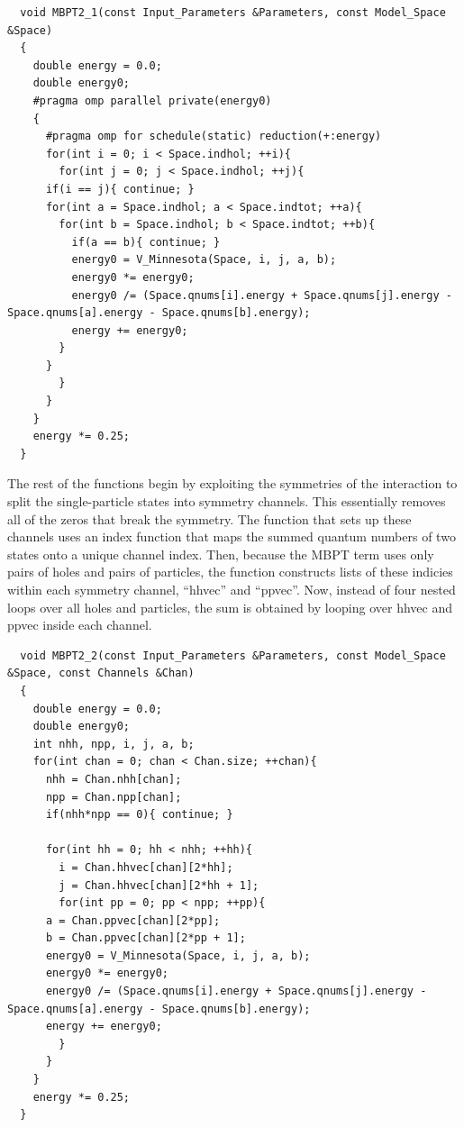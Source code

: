 \begin{lstlisting}
  void MBPT2_1(const Input_Parameters &Parameters, const Model_Space &Space)
  {
    double energy = 0.0;
    double energy0;
    #pragma omp parallel private(energy0)
    {
      #pragma omp for schedule(static) reduction(+:energy)
      for(int i = 0; i < Space.indhol; ++i){
        for(int j = 0; j < Space.indhol; ++j){
	  if(i == j){ continue; }
	  for(int a = Space.indhol; a < Space.indtot; ++a){
	    for(int b = Space.indhol; b < Space.indtot; ++b){
	      if(a == b){ continue; }
	      energy0 = V_Minnesota(Space, i, j, a, b);
	      energy0 *= energy0;
	      energy0 /= (Space.qnums[i].energy + Space.qnums[j].energy - Space.qnums[a].energy - Space.qnums[b].energy);
	      energy += energy0;
	    }
	  }
        }
      }
    }
    energy *= 0.25;
  }
\end{lstlisting}

The rest of the functions begin by exploiting the symmetries of the interaction to split the single-particle states into symmetry channels. This essentially removes all of the zeros that break the symmetry. The function that sets up these channels uses an index function that maps the summed quantum numbers of two states onto a unique channel index. Then, because the MBPT term uses only pairs of holes and pairs of particles, the function constructs lists of these indicies within each symmetry channel, ``hhvec'' and ``ppvec''. Now, instead of four nested loops over all holes and particles, the sum is obtained by looping over hhvec and ppvec inside each channel.

\begin{lstlisting}
  void MBPT2_2(const Input_Parameters &Parameters, const Model_Space &Space, const Channels &Chan)
  {
    double energy = 0.0;
    double energy0;
    int nhh, npp, i, j, a, b;
    for(int chan = 0; chan < Chan.size; ++chan){
      nhh = Chan.nhh[chan];
      npp = Chan.npp[chan];
      if(nhh*npp == 0){ continue; }
      
      for(int hh = 0; hh < nhh; ++hh){
        i = Chan.hhvec[chan][2*hh];
        j = Chan.hhvec[chan][2*hh + 1];
        for(int pp = 0; pp < npp; ++pp){
	  a = Chan.ppvec[chan][2*pp];
	  b = Chan.ppvec[chan][2*pp + 1];
	  energy0 = V_Minnesota(Space, i, j, a, b);
	  energy0 *= energy0;
	  energy0 /= (Space.qnums[i].energy + Space.qnums[j].energy - Space.qnums[a].energy - Space.qnums[b].energy);
	  energy += energy0;
        }
      }
    }
    energy *= 0.25;
  }
\end{lstlisting}

